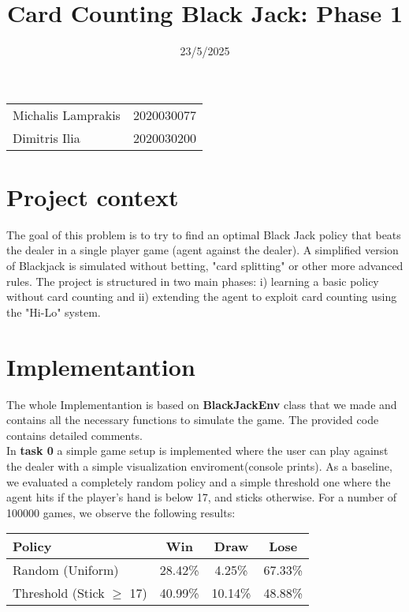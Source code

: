 \documentclass{article}
\title{ Card Counting Black Jack: Phase 1}
\date{23/5/2025}
\begin{document}
\maketitle

\noindent\begin{tabular}{@{}ll}
       Michalis Lamprakis & 2020030077\\
       Dimitris Ilia & 2020030200
\end{tabular}

\section*{Project context}

 The goal of this problem is to try to find an optimal Black Jack 
 policy that beats the dealer in a single player game (agent against 
 the dealer). A simplified version of Blackjack is simulated 
 without betting, "card splitting" or other more advanced rules.
 The project is structured in two main phases: i) 
 learning a basic policy without card counting and ii) 
 extending the agent to exploit card counting using the "Hi-Lo" 
 system. 

\section*{Implementantion}

The whole Implementantion is based on {\bf BlackJackEnv} class that
we made and contains all the necessary functions to simulate 
the game. The provided code contains detailed comments.\\

\noindent In {\bf task 0} a simple game setup is implemented where the user can play
against the dealer with a simple visualization enviroment(console prints).
As a baseline, we evaluated a completely random policy and a 
simple threshold one where  the agent hits if the player’s hand is 
below 17, and sticks otherwise. For a number of 100000 games, 
we observe the following results:

\begin{table}[h!]
\centering
\begin{tabular}{lccc}
\toprule
\textbf{Policy} & \textbf{Win} & \textbf{Draw} & \textbf{Lose} \\
\midrule
Random (Uniform)     & 28.42\% & 4.25\%  & 67.33\% \\
Threshold (Stick $\geq$ 17) & 40.99\% & 10.14\% & 48.88\% \\
\bottomrule
\end{tabular}
\end{table}
\end{document}
